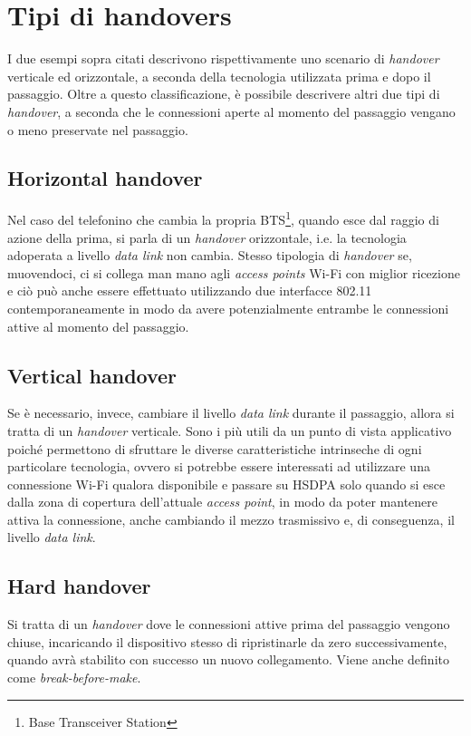 \section{Tipi di handovers}

I due esempi sopra citati descrivono rispettivamente uno scenario di {\em handover} verticale ed orizzontale, a seconda della tecnologia utilizzata prima e dopo il passaggio. Oltre a questo classificazione, è possibile descrivere altri due tipi di {\em handover}, a seconda che le connessioni aperte al momento del passaggio vengano o meno preservate nel passaggio.

\subsection{Horizontal handover}
Nel caso del telefonino che cambia la propria BTS\footnote{Base Transceiver Station}, quando esce dal raggio di azione della prima, si parla di un {\em handover} orizzontale, i.e. la tecnologia adoperata a livello {\em data link} non cambia. Stesso tipologia di {\em handover} se, muovendoci, ci si collega man mano agli {\em access points} Wi-Fi con miglior ricezione e ciò può anche essere effettuato utilizzando due interfacce 802.11 contemporaneamente in modo da avere potenzialmente entrambe le connessioni attive al momento del passaggio.

\subsection{Vertical handover}
Se è necessario, invece, cambiare il livello {\em data link} durante il passaggio, allora si tratta di un {\em handover} verticale. Sono i più utili da un punto di vista applicativo poiché permettono di sfruttare le diverse caratteristiche intrinseche di ogni particolare tecnologia, ovvero si potrebbe essere interessati ad utilizzare una connessione Wi-Fi qualora disponibile e passare su HSDPA solo quando si esce dalla zona di copertura dell'attuale {\em access point}, in modo da poter mantenere attiva la connessione, anche cambiando il mezzo trasmissivo e, di conseguenza, il livello {\em data link}.

\subsection{Hard handover}
Si tratta di un {\em handover} dove le connessioni attive prima del passaggio vengono chiuse, incaricando il dispositivo stesso di ripristinarle da zero successivamente, quando avrà stabilito con successo un nuovo collegamento. Viene anche definito come {\em break-before-make}.

